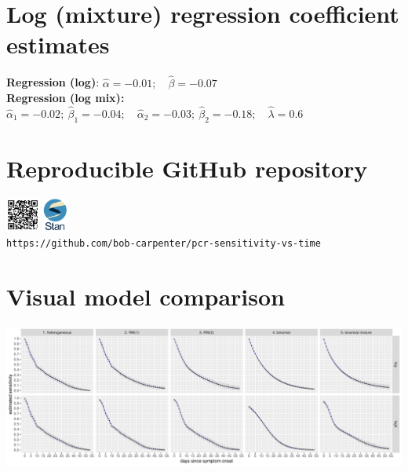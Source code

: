 \documentclass[plainboxedsections]{sciposter}
\begin{document}
\begin{multicols}{2}
\begin{center}
\section{Log (mixture) regression coefficient estimates}

{\bf Regression (log)}: $\widehat{\alpha} = -0.01; \quad \widehat{\beta} =
-0.07$ \hfill \null
\\[4pt]
{\bf Regression (log mix):} $\widehat{\alpha}_1 = -0.02; \ \widehat{\beta}_1 = -0.04; \quad
\widehat{\alpha}_2 = -0.03; \ \widehat{\beta}_2 = -0.18; \quad \widehat{\lambda} = 0.6$ \hfill \null



\section{Reproducible GitHub repository}
\null \hfill
\includegraphics[width=0.0825\textwidth]{img/qr-code.pdf}
\hfill
\includegraphics[width=0.065\textwidth]{img/stan-logo.png}
\hfill \null
\\
\texttt{https://github.com/bob-carpenter/pcr-sensitivity-vs-time}
\end{center}
\end{multicols}


\section{Visual model comparison}
  \includegraphics[width=\textwidth]{img/model-link-comparison.pdf}
\end{document}
